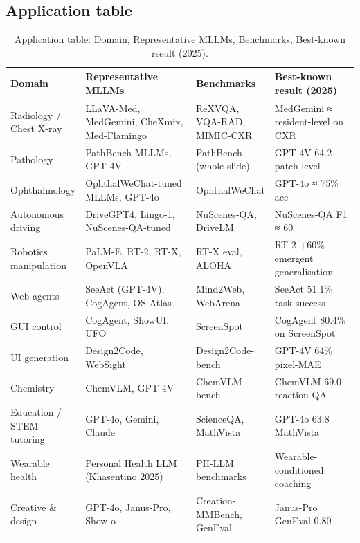 \documentclass{article}
\begin{document}
\subsection{Application table}\label{application-table}

\begin{table}[t]
\centering
\caption{Application table: Domain, Representative MLLMs, Benchmarks, Best-known result (2025).}
\label{tab:application-table}
\begin{tabular}{>{\raggedright\arraybackslash}p{0.1969\linewidth}
  >{\raggedright\arraybackslash}p{0.3386\linewidth}
  >{\raggedright\arraybackslash}p{0.2047\linewidth}
  >{\raggedright\arraybackslash}p{0.2598\linewidth}}
\toprule
\textbf{Domain} & \textbf{Representative MLLMs} & \textbf{Benchmarks} & \textbf{Best-known result (2025)} \\
\midrule
Radiology / Chest X-ray & LLaVA-Med, MedGemini, CheXmix, Med-Flamingo & ReXVQA, VQA-RAD, MIMIC-CXR & MedGemini ≈ resident-level on CXR \\
Pathology & PathBench MLLMs, GPT-4V & PathBench (whole-slide) & GPT-4V 64.2 patch-level \\
Ophthalmology & OphthalWeChat-tuned MLLMs, GPT-4o & OphthalWeChat & GPT-4o ≈ 75\% acc \\
Autonomous driving & DriveGPT4, Lingo-1, NuScenes-QA-tuned & NuScenes-QA, DriveLM & NuScenes-QA F1 ≈ 60 \\
Robotics manipulation & PaLM-E, RT-2, RT-X, OpenVLA & RT-X eval, ALOHA & RT-2 +60\% emergent generalisation \\
Web agents & SeeAct (GPT-4V), CogAgent, OS-Atlas & Mind2Web, WebArena & SeeAct 51.1\% task success \\
GUI control & CogAgent, ShowUI, UFO & ScreenSpot & CogAgent 80.4\% on ScreenSpot \\
UI generation & Design2Code, WebSight & Design2Code-bench & GPT-4V 64\% pixel-MAE \\
Chemistry & ChemVLM, GPT-4V & ChemVLM-bench & ChemVLM 69.0 reaction QA \\
Education / STEM tutoring & GPT-4o, Gemini, Claude & ScienceQA, MathVista & GPT-4o 63.8 MathVista \\
Wearable health & Personal Health LLM (Khasentino 2025) & PH-LLM benchmarks & Wearable-conditioned coaching \\
Creative \& design & GPT-4o, Janus-Pro, Show-o & Creation-MMBench, GenEval & Janus-Pro GenEval 0.80 \\
\end{tabular}
\end{table}
\end{document}
